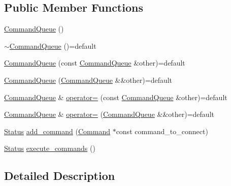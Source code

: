 \subsection*{Public Member Functions}
\begin{DoxyCompactItemize}
\item 
\hyperlink{classmt_1_1_command_queue_a2e7c4eb3af78a2660ab4087baa265b26_a2e7c4eb3af78a2660ab4087baa265b26}{Command\+Queue} ()
\item 
\hyperlink{classmt_1_1_command_queue_aa193a8792c8fa9705945dcdec70f4c59_aa193a8792c8fa9705945dcdec70f4c59}{$\sim$\+Command\+Queue} ()=default
\item 
\hyperlink{classmt_1_1_command_queue_a9f6710ef30b97b5042fa331bce1d51a0_a9f6710ef30b97b5042fa331bce1d51a0}{Command\+Queue} (const \hyperlink{classmt_1_1_command_queue}{Command\+Queue} \&other)=default
\item 
\hyperlink{classmt_1_1_command_queue_ae44068dfc0d9a729fc4e45edf887ddd7_ae44068dfc0d9a729fc4e45edf887ddd7}{Command\+Queue} (\hyperlink{classmt_1_1_command_queue}{Command\+Queue} \&\&other)=default
\item 
\hyperlink{classmt_1_1_command_queue}{Command\+Queue} \& \hyperlink{classmt_1_1_command_queue_a2b65fc85016dac2dec92fab725d70e39_a2b65fc85016dac2dec92fab725d70e39}{operator=} (const \hyperlink{classmt_1_1_command_queue}{Command\+Queue} \&other)=default
\item 
\hyperlink{classmt_1_1_command_queue}{Command\+Queue} \& \hyperlink{classmt_1_1_command_queue_a777a1ad90b9e965d09c73f6dc63cc9c3_a777a1ad90b9e965d09c73f6dc63cc9c3}{operator=} (\hyperlink{classmt_1_1_command_queue}{Command\+Queue} \&\&other)=default
\item 
\hyperlink{namespacemt_a37bcfa13fedca18b19425e07bb66e177_a37bcfa13fedca18b19425e07bb66e177}{Status} \hyperlink{classmt_1_1_command_queue_a1e236f8d899abf2bc6b0e52e0b2bf691_a1e236f8d899abf2bc6b0e52e0b2bf691}{add\+\_\+command} (\hyperlink{classmt_1_1_command}{Command} $\ast$const command\+\_\+to\+\_\+connect)
\item 
\hyperlink{namespacemt_a37bcfa13fedca18b19425e07bb66e177_a37bcfa13fedca18b19425e07bb66e177}{Status} \hyperlink{classmt_1_1_command_queue_a17f0a42a4f078a938b3ac80c67055879_a17f0a42a4f078a938b3ac80c67055879}{execute\+\_\+commands} ()
\end{DoxyCompactItemize}


\subsection{Detailed Description}


